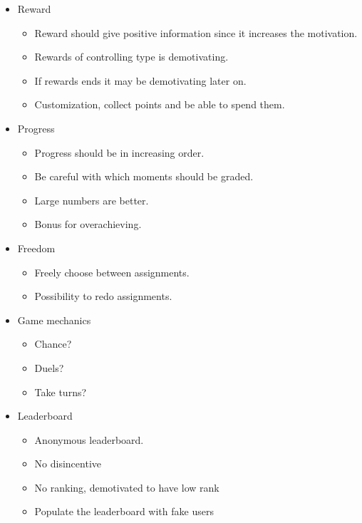 \begin{itemize}
\item Reward
\begin{itemize}
 \item Reward should give positive information since it increases the motivation.
 \item Rewards of controlling type is demotivating.
 \item If rewards ends it may be demotivating later on.
 \item Customization, collect points and be able to spend them.
 \end{itemize}
\item Progress
\begin{itemize}
    \item Progress should be in increasing order.
    \item Be careful with which moments should be graded.
    \item Large numbers are better.
    \item Bonus for overachieving. 
\end{itemize}
\item Freedom
\begin{itemize}
    \item Freely choose between assignments.
    \item Possibility to redo assignments.
\end{itemize}
\item Game mechanics
\begin{itemize}
    \item Chance?
    \item Duels?
    \item Take turns?
\end{itemize}
\item Leaderboard
\begin{itemize}
    \item Anonymous leaderboard.
    \item No disincentive
    \item No ranking, demotivated to have low rank
    \item Populate the leaderboard with fake users
\end{itemize}
\end{itemize}

